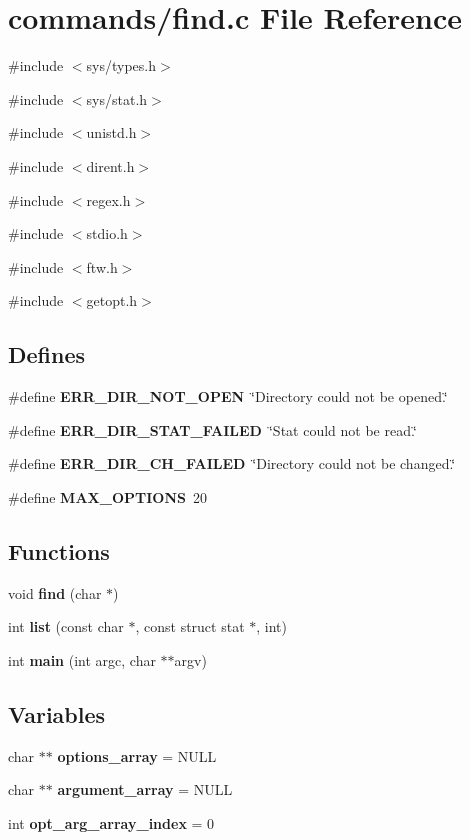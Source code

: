 \section{commands/find.c File Reference}
\label{find_8c}
{\ttfamily \#include $<$sys/types.h$>$}\par
{\ttfamily \#include $<$sys/stat.h$>$}\par
{\ttfamily \#include $<$unistd.h$>$}\par
{\ttfamily \#include $<$dirent.h$>$}\par
{\ttfamily \#include $<$regex.h$>$}\par
{\ttfamily \#include $<$stdio.h$>$}\par
{\ttfamily \#include $<$ftw.h$>$}\par
{\ttfamily \#include $<$getopt.h$>$}\par
\subsection*{Defines}
\begin{DoxyCompactItemize}
\item 
\#define {\bf ERR\_\-DIR\_\-NOT\_\-OPEN}~\char`\"{}Directory could not be opened.\char`\"{}
\item 
\#define {\bf ERR\_\-DIR\_\-STAT\_\-FAILED}~\char`\"{}Stat could not be read.\char`\"{}
\item 
\#define {\bf ERR\_\-DIR\_\-CH\_\-FAILED}~\char`\"{}Directory could not be changed.\char`\"{}
\item 
\#define {\bf MAX\_\-OPTIONS}~20
\end{DoxyCompactItemize}
\subsection*{Functions}
\begin{DoxyCompactItemize}
\item 
void {\bf find} (char $\ast$)
\item 
int {\bf list} (const char $\ast$, const struct stat $\ast$, int)
\item 
int {\bf main} (int argc, char $\ast$$\ast$argv)
\end{DoxyCompactItemize}
\subsection*{Variables}
\begin{DoxyCompactItemize}
\item 
char $\ast$$\ast$ {\bf options\_\-array} = NULL
\item 
char $\ast$$\ast$ {\bf argument\_\-array} = NULL
\item 
int {\bf opt\_\-arg\_\-array\_\-index} = 0
\end{DoxyCompactItemize}


